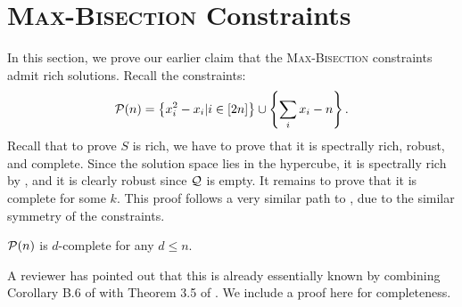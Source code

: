 \section{\textsc{Max-Bisection} Constraints}\label{sec:balance}
In this section, we prove our earlier claim that the \textsc{Max-Bisection} constraints admit rich solutions. Recall the constraints:
\[\mathcal P(n) = \left\{x_i^2 - x_i | i \in [2n]\right\} \cup \left\{\sum_i x_i - n\right\}.\]
%
Recall that to prove $S$ is rich, we have to prove that it is spectrally rich, robust, and complete. Since the solution space lies in the hypercube, it is spectrally rich by , and it is clearly robust since $\mathcal Q$ is empty. It remains to prove that it is complete for some $k$. This proof follows a very similar path to \cite{Braun:2016:MPN:2884435.2884510}, due to the similar symmetry of the constraints. 
\begin{lemma}
$\mathcal P(n)$ is $d$-complete for any $d \leq n$.
\end{lemma}
\begin{remark}
A reviewer has pointed out that this is already essentially known by combining Corollary B.6 of \cite{LPdWY16} with Theorem 3.5 of \cite{FM16}. We include a proof here for completeness.
\end{remark}
